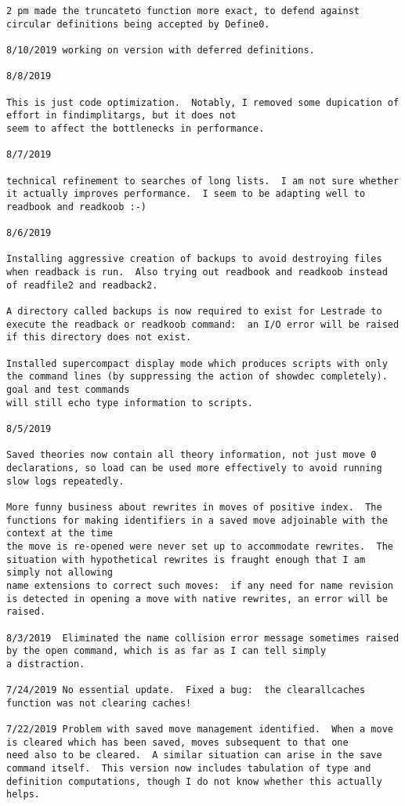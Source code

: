 \documentclass{article}
\begin{document}
{\begin{verbatim}
2 pm made the truncateto function more exact, to defend against circular definitions being accepted by Define0.

8/10/2019 working on version with deferred definitions.

8/8/2019

This is just code optimization.  Notably, I removed some dupication of effort in findimplitargs, but it does not
seem to affect the bottlenecks in performance.

8/7/2019

technical refinement to searches of long lists.  I am not sure whether it actually improves performance.  I seem to be adapting well to readbook and readkoob :-)

8/6/2019

Installing aggressive creation of backups to avoid destroying files when readback is run.  Also trying out readbook and readkoob instead of readfile2 and readback2.

A directory called backups is now required to exist for Lestrade to execute the readback or readkoob command:  an I/O error will be raised if this directory does not exist.

Installed supercompact display mode which produces scripts with only the command lines (by suppressing the action of showdec completely).  goal and test commands
will still echo type information to scripts.

8/5/2019

Saved theories now contain all theory information, not just move 0 declarations, so load can be used more effectively to avoid running slow logs repeatedly.

More funny business about rewrites in moves of positive index.  The functions for making identifiers in a saved move adjoinable with the context at the time
the move is re-opened were never set up to accommodate rewrites.  The situation with hypothetical rewrites is fraught enough that I am simply not allowing
name extensions to correct such moves:  if any need for name revision is detected in opening a move with native rewrites, an error will be raised.

8/3/2019  Eliminated the name collision error message sometimes raised by the open command, which is as far as I can tell simply
a distraction.

7/24/2019 No essential update.  Fixed a bug:  the clearallcaches function was not clearing caches!

7/22/2019 Problem with saved move management identified.  When a move is cleared which has been saved, moves subsequent to that one
need also to be cleared.  A similar situation can arise in the save command itself.  This version now includes tabulation of type and
definition computations, though I do not know whether this actually helps.


\end{verbatim}}
\end{document}

